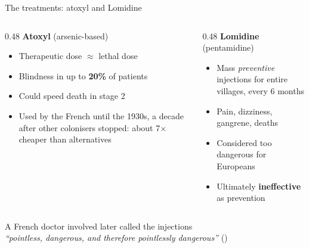 \documentclass[aspectratio=1610]{beamer}
\newcommand{\highlight}[1]{\textcolor{accent}{\textbf{#1}}}
\newcommand{\refs}[1]{{\footnotesize\color{softgray}(\citealp{#1})}} %
\begin{document}
\begin{frame}{The treatments: atoxyl and Lomidine}
  \begin{columns}[T]
    \begin{column}{0.48\textwidth}
      \textbf{Atoxyl} (arsenic-based)
      \begin{itemize}
        \item Therapeutic dose $\approx$ lethal dose
        \item Blindness in up to \highlight{20\%} of patients
        \item Could speed death in stage 2
        \item Used by the French until the 1930s, a decade after other colonisers stopped:
          about 7$\times$ cheaper than alternatives
      \end{itemize}
    \end{column}
    \begin{column}{0.48\textwidth}
      \textbf{Lomidine} (pentamidine)
      \begin{itemize}
        \item Mass \emph{preventive} injections for entire villages, every 6 months
        \item Pain, dizziness, gangrene, deaths
        \item Considered too dangerous for Europeans
        \item Ultimately \highlight{ineffective} as prevention
      \end{itemize}
    \end{column}
  \end{columns}
  \vspace{1em}
  \centering
  \small A French doctor involved later called the injections\\
  \emph{``pointless, dangerous, and therefore pointlessly dangerous''} \refs{lachenal_2017}
\end{frame}
\end{document}
